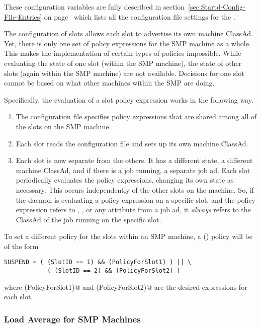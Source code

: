 These configuration variables are fully described in
section~\ref{sec:Startd-Config-File-Entries} on
page~\pageref{sec:Startd-Config-File-Entries} which lists all the
configuration file settings for the .

The configuration of slots allows each slot to advertise
its own machine ClassAd.
Yet, there is only one set of policy expressions for the SMP
machine as a whole.
This makes the implementation of certain types of policies impossible.
While evaluating the state of one slot (within the SMP machine),
the state of other slots (again within the SMP machine) are not
available.
Decisions for one slot cannot be based on what other machines within the SMP
are doing.

Specifically, the evaluation of a slot policy expression works in
the following way.
\begin{enumerate}
\item 
The configuration file specifies policy expressions that are shared among
all of the slots on the SMP machine.
\item 
Each slot reads the configuration file and sets up its own machine ClassAd.
\item 
Each slot is now separate from the others.  It has a
different state, a different machine ClassAd, and if there is a job
running, a separate job ad.
Each slot periodically
evaluates the policy expressions, changing its own state
as necessary.
This occurs independently of the other slots on the machine.
So, if the  daemon is evaluating a policy expression
on a specific slot,
and the policy expression refers to , ,
or any attribute from a job ad,
it \emph{always} refers to the ClassAd of the
job running on the specific slot.
\end{enumerate}

To set a different policy for the slots within an SMP machine,
a (\verb@SUSPEND@) policy will be of the form
\begin{verbatim}
SUSPEND = ( (SlotID == 1) && (PolicyForSlot1) ) || \
            ( (SlotID == 2) && (PolicyForSlot2) )
\end{verbatim}
where \verb@(PolicyForSlot1)@ and \verb@(PolicyForSlot2)@ are the
desired expressions for each slot.

\subsubsection{\label{sec:SMP-Load}
Load Average for SMP Machines}

